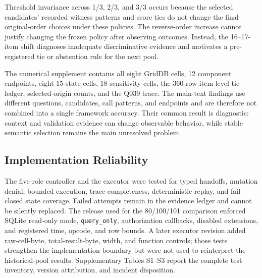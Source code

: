 \documentclass[applsci,article,submit,moreauthors]{Definitions/mdpi}
\begin{document}
Threshold invariance across 1/3, 2/3, and 3/3 occurs because the selected candidates' recorded witness patterns and score ties do not change the final original-order choices under these policies. The reverse-order increase cannot justify changing the frozen policy after observing outcomes. Instead, the 16--17-item shift diagnoses inadequate discriminative evidence and motivates a pre-registered tie or abstention rule for the next pool.

\begin{table}[htbp]
\caption{Complete-witness selector sensitivity summarized across invariant-pass thresholds. Results were identical at 1/3, 2/3, and 3/3 for every weight/order pair; coverage was 180/180 throughout.}
\label{tab:sensitivity}
\centering
\small
{}
\end{table}

The numerical supplement contains all eight GridDB cells, 12 component endpoints, eight 15-state cells, 18 sensitivity cells, the 360-row item-level tie ledger, selected-origin counts, and the Q039 trace. The main-text findings use different questions, candidates, call patterns, and endpoints and are therefore not combined into a single framework accuracy. Their common result is diagnostic: context and validation evidence can change observable behavior, while stable semantic selection remains the main unresolved problem.

\subsection{Implementation Reliability}

The five-role controller and the executor were tested for typed handoffs, mutation denial, bounded execution, trace completeness, deterministic replay, and fail-closed state coverage. Failed attempts remain in the evidence ledger and cannot be silently replaced. The release used for the 80/100/101 comparison enforced SQLite read-only mode, \texttt{query\_only}, authorization callbacks, disabled extensions, and registered time, opcode, and row bounds. A later executor revision added raw-cell-byte, total-result-byte, width, and function controls; those tests strengthen the implementation boundary but were not used to reinterpret the historical-pool results. Supplementary Tables S1--S3 report the complete test inventory, version attribution, and incident disposition.
\end{document}
